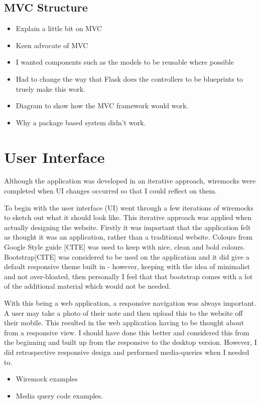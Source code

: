 

\subsection{MVC Structure}
\begin{itemize}
  \item Explain a little bit on MVC
  \item Keen advocate of MVC
  \item I wanted components such as the models to be reusable where possible
  \item Had to change the way that Flask does the controllers to be blueprints to truely make this work.
  \item Diagram to show how the MVC framework would work.
  \item Why a package based system didn't work.

\end{itemize}




\section{User Interface}
Although the application was developed in an iterative approach, wiremocks were completed when UI changes occurred so that I could reflect on them.

To begin with the user interface (UI) went through a few iterations of wiremocks to sketch out what it should look like.  This iterative approach was applied when actually designing the website. Firstly it was important that the application felt as thought it was an application, rather than a traditional website. Colours from Google Style guide [CITE] was used to keep with nice, clean and bold colours. Bootstrap[CITE] was considered to be used on the application and it did give a default responsive theme built in - however, keeping with the idea of minimalist and not over-bloated, then personally I feel that that bootstrap comes with a lot of the additional material which would not be needed.

With this being a web application, a responsive navigation was always important. A user may take a photo of their note and then upload this to the website off their mobile. This resulted in the web application having to be thought about from a responsive view. I should have done this better and considered this from the beginning and built up from the responsive to the desktop version. However, I did retrospective responsive design and performed media-queries when I needed to.
\begin{itemize}
  \item Wiremock examples
  \item Media query code examples.
\end{itemize}

